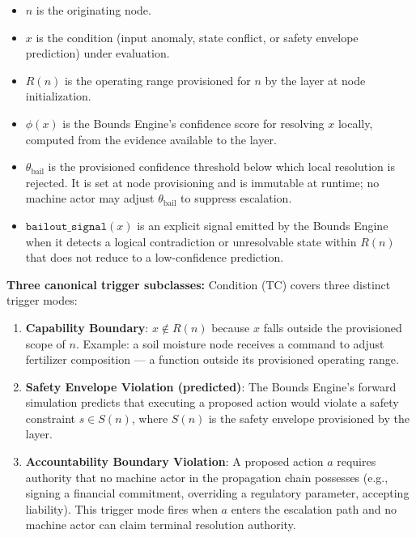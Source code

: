 \begin{itemize}\itemsep=0pt
\item $n$ is the originating node.
\item $x$ is the condition (input anomaly, state conflict, or safety
  envelope prediction) under evaluation.
\item $R(n)$ is the operating range provisioned for $n$ by the \purpose{}
  layer at node initialization.
\item $\phi(x)$ is the Bounds Engine's confidence score for resolving $x$
  locally, computed from the evidence available to the \bounds{} layer.
\item $\theta_{\text{bail}}$ is the provisioned confidence threshold below
  which local resolution is rejected. It is set at node provisioning and is
  immutable at runtime; no machine actor may adjust $\theta_{\text{bail}}$ to
  suppress escalation.
\item $\texttt{bailout\_signal}(x)$ is an explicit signal emitted by the
  Bounds Engine when it detects a logical contradiction or unresolvable
  state within $R(n)$ that does not reduce to a low-confidence prediction.
\end{itemize}

\bigskip
\noindent\textbf{Three canonical trigger subclasses:} Condition (TC) covers
three distinct trigger modes:

\begin{enumerate}\itemsep=0pt
\item \textbf{Capability Boundary}: $x \notin R(n)$ because $x$ falls outside
  the provisioned scope of $n$. Example: a soil moisture node receives a
  command to adjust fertilizer composition — a function outside its
  provisioned operating range.

\item \textbf{Safety Envelope Violation (predicted)}: The Bounds Engine's
  forward simulation predicts that executing a proposed action would violate
  a safety constraint $s \in S(n)$, where $S(n)$ is the safety envelope
  provisioned by the \purpose{} layer.

\item \textbf{Accountability Boundary Violation}: A proposed action $a$
  requires authority that no machine actor in the propagation chain possesses
  (e.g., signing a financial commitment, overriding a regulatory parameter,
  accepting liability). This trigger mode fires when $a$ enters the escalation
  path and no machine actor can claim terminal resolution authority.
\end{enumerate}

